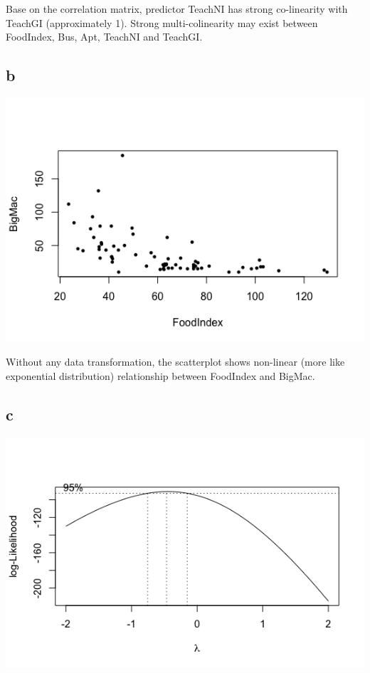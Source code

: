\documentclass[11pt,letterpaper]{article}
\begin{document}
\noindent Base on the correlation matrix, predictor TeachNI has strong co-linearity with TeachGI (approximately 1). Strong multi-colinearity may exist between FoodIndex, Bus, Apt, TeachNI and TeachGI.

\subsection*{b}
\includegraphics[scale=0.7]{2-b-1.png}

\noindent Without any data transformation, the scatterplot shows non-linear (more like exponential distribution) relationship between FoodIndex and BigMac. 

\subsection*{c}
\includegraphics[scale=0.7]{2-c-1.png}
\end{document}
